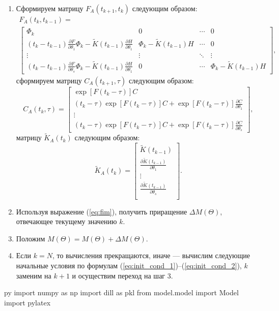 \documentclass[a4paper,14pt]{extarticle}
\newcommand{\pd}[2]{\frac{\partial #1}{\partial #2}}
\begin{document}
\begin{enumerate}
\item Сформируем матрицу $F_A(t_{k+1}, t_k)$ следующим образом:
\begin{gather*}
	F_A(t_k, t_{k-1}) = \\
	\begin{bmatrix}
		\Phi_k & 0 & \cdots & 0 \\
		(t_k - t_{k-1}) \pd{F}{\theta_1} \Phi_k - \tilde{K}(t_{k-1})
			\pd{H}{\theta_1} & \Phi_k - \tilde{K}(t_{k-1}) H & \cdots & 0 \\
		\vdots & \vdots & \ddots & \vdots \\
		(t_k - t_{k-1}) \pd{F}{\theta_s} \Phi_k - \tilde{K}(t_{k-1})
			\pd{H}{\theta_1} & 0 & \cdots & \Phi_k - \tilde{K}(t_{k-1}) H
	\end{bmatrix},
\end{gather*}
сформируем матрицу $C_A(t_{k+1}, \tau)$ следующим образом:
	\[
		C_A(t_k, \tau) =
		\begin{bmatrix}
			\exp[ F(t_k - \tau) ] C \\
			(t_k - \tau) \exp[F(t_k - \tau)] C + \exp[ F(t_k - \tau) ]
				\pd{C}{\theta_1} \\
			\vdots \\
			(t_k - \tau) \exp[F(t_k - \tau)] C + \exp[ F(t_k - \tau) ]
				\pd{C}{\theta_s} 
		\end{bmatrix},
	\]
матрицу $\tilde{K}_A(t_k)$ следующим образом:
\[
	\tilde{K}_A(t_k) =
	\begin{bmatrix}
		\tilde{K}(t_{k-1}) \\
		\pd{\tilde{K}(t_{k-1})}{\theta_1} \\
		\vdots \\
		\pd{\tilde{K}(t_{k-1})}{\theta_s} \\
	\end{bmatrix}.
\]

\item Используя выражение (\ref{eq:fim}), получить приращение 
	$\Delta M(\Theta)$, отвечающее текущему значению $k$.

\item Положим $M(\Theta) = M(\Theta) + \Delta M(\Theta)$.

\item Если $k = N$, то вычисления прекращаются, иначе --- вычислим следующие
	начальные условия по формулам (\ref{eq:init_cond_1})--(\ref{eq:init_cond_2}),
	$k$ заменим на $k + 1$ и осуществим переход на шаг 3.

\end{enumerate}

\begin{pythontexcustomcode}{py}
import numpy as np
import dill as pkl
from model.model import Model
import pylatex
\end{pythontexcustomcode}
\end{document}
